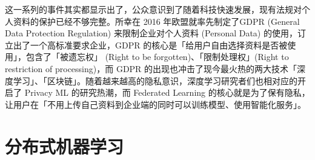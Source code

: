  
这一系列的事件其实都显示出了，公众意识到了随着科技快速发展，现有法规对个人资料的保护已经不够完整。所幸在 2016 年欧盟就率先制定了GDPR (General Data Protection Regulation) 来限制企业对个人资料 (Personal Data) 的使用，订立出了一个高标准要求企业，GDPR 的核心是「给用户自由选择资料是否被使用」，包含了「被遗忘权」 (Right to be forgotten)、「限制处理权」(Right to restriction of processing)，而 GDPR 的出现也冲击了现今最火热的两大技术「深度学习」、「区块链」。随着越来越高的隐私意识，深度学习研究者们也相对应的开启了 Privacy ML 的研究热潮，而 Federated Learning 的核心就是为了保有隐私，让用户在「不用上传自己资料到企业端的同时可以训练模型、使用智能化服务」。

\section{分布式机器学习}

